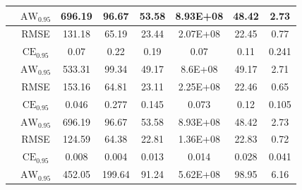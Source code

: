 \documentclass[letterpaper]{article} %
\begin{document}
\begin{table}[t]
\begin{tabular}{|c|c|c|c|c|c|c|c|}
        \rule{0pt}{2ex} 
		& $\text{AW}_{0.95}$ & \cellcolor{gray!5}696.19 & \cellcolor{gray!10}96.67 & \cellcolor{gray!15}53.58 & \cellcolor{gray!20}8.93E+08 & \cellcolor{gray!25}48.42 & \cellcolor{gray!30}2.73 \\ \hline \hline
        \rule{0pt}{2ex} 
		\multirow{3}{*}{Quantile Estimator} & RMSE & \cellcolor{gray!5}131.18 & \cellcolor{gray!10}65.19 & \cellcolor{gray!15}23.44 & \cellcolor{gray!20}2.07E+08 & \cellcolor{gray!25}22.45 & \cellcolor{gray!30}0.77 \\
        \rule{0pt}{2ex} 
		& $\text{CE}_{0.95}$ & \cellcolor{gray!5}0.07 & \cellcolor{gray!10}0.22 & \cellcolor{gray!15}0.19 &\cellcolor{gray!20} 0.07 & \cellcolor{gray!25}0.11 & \cellcolor{gray!30}0.241 \\
        \rule{0pt}{2ex} 
		& $\text{AW}_{0.95}$ & \cellcolor{gray!5}533.31 & \cellcolor{gray!10}99.34 & \cellcolor{gray!15}49.17 & \cellcolor{gray!20}8.6E+08 & \cellcolor{gray!25}49.17 & \cellcolor{gray!30}2.71 \\ \hline \hline
        \rule{0pt}{2ex} 
		\multirow{3}{*}{BNN} & RMSE & \cellcolor{gray!5}153.16 & \cellcolor{gray!10}64.81 & \cellcolor{gray!15}23.11 & \cellcolor{gray!20}2.25E+08 & \cellcolor{gray!25}22.46 & \cellcolor{gray!30}0.65 \\
        \rule{0pt}{2ex} 
		& $\text{CE}_{0.95}$ & \cellcolor{gray!5}0.046 & \cellcolor{gray!10}0.277 & \cellcolor{gray!15}0.145 &\cellcolor{gray!20} 0.073 & \cellcolor{gray!25}0.12 & \cellcolor{gray!30}0.105 \\
        \rule{0pt}{2ex} 
		& $\text{AW}_{0.95}$ & \cellcolor{gray!5}696.19 & \cellcolor{gray!10}96.67 & \cellcolor{gray!15}53.58 & \cellcolor{gray!20}8.93E+08 & \cellcolor{gray!25}48.42 & \cellcolor{gray!30}2.73 \\ \hline \hline
        \rule{0pt}{2ex} 
		\multirow{3}{*}{ HNN } & RMSE & \cellcolor{gray!5}124.59 & \cellcolor{gray!10}64.38 & \cellcolor{gray!15}22.81 & \cellcolor{gray!20}1.36E+08 & \cellcolor{gray!25}22.83 & \cellcolor{gray!30}0.72 \\
        \rule{0pt}{2ex} 
		& $\text{CE}_{0.95}$ & \cellcolor{gray!5}0.008 & \cellcolor{gray!10}0.004 & \cellcolor{gray!15}0.013 & \cellcolor{gray!20}0.014 &\cellcolor{gray!25} 0.028 & \cellcolor{gray!30}0.041 \\
        \rule{0pt}{2ex} 
		& $\text{AW}_{0.95}$ & \cellcolor{gray!5}452.05 & \cellcolor{gray!10}199.64 & \cellcolor{gray!15}91.24 & \cellcolor{gray!20}5.62E+08 & \cellcolor{gray!25}98.95 & \cellcolor{gray!30}6.16 \\\hline \hline
        

\end{tabular}
\end{table}
\end{document}
